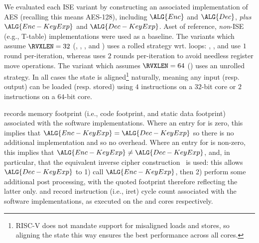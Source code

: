 
We evaluated each ISE variant by constructing an associated implementation
of AES (recalling this means AES-128), including
$\ALG{Enc}$
and
$\ALG{Dec}$,
{\em plus}
$\ALG{Enc-KeyExp}$
and
$\ALG{Dec-KeyExp}$.
Aset of reference, {\em non}-ISE 
(e.g., T-table) 
implementations were used as a baseline.
The variants which assume  $\RVXLEN = 32$
(, ,     , and )
uses a    rolled strategy wrt. loops:
 , ,              and 
use  $1$ round  per-iteration,
whereas
uses $2$ rounds per-iteration
to avoid needless register move operations.
The variant  which assumes $\RVXLEN = 64$
()
uses an unrolled strategy.
In all cases the state is aligned\footnote{%
RISC-V does not mandate support for misaligned loads and stores, so
aligning the state this way ensures the best performance across all
cores.
} naturally, meaning any input (resp. output) can be loaded (resp. stored) 
using 
$4$  instructions on a $32$-bit core
or
$2$  instructions on a $64$-bit core.

records
memory footprint (i.e., code footprint, and static data footprint)
associated with the software implementations.
Where an entry for
is     zero, this implies that
$\ALG{Enc-KeyExp} =    \ALG{Dec-KeyExp}$
so there is no additional implementation and so no overhead.
Where an entry for
is non-zero, this implies that
$\ALG{Enc-KeyExp} \neq \ALG{Dec-KeyExp}$,
and, in particular, that the equivalent inverse cipher construction~\cite[Section 5.3.5]{FIPS:197}
is used: this allows $\ALG{Dec-KeyExp}$ to
1) call $\ALG{Enc-KeyExp}$,
   then
2) perform some additional post processing,
with the quoted footprint therefore reflecting the latter only.  
and
record
instruction (i.e., iret) cycle count
associated with the software implementations,
as executed on the  and  cores respectively.

